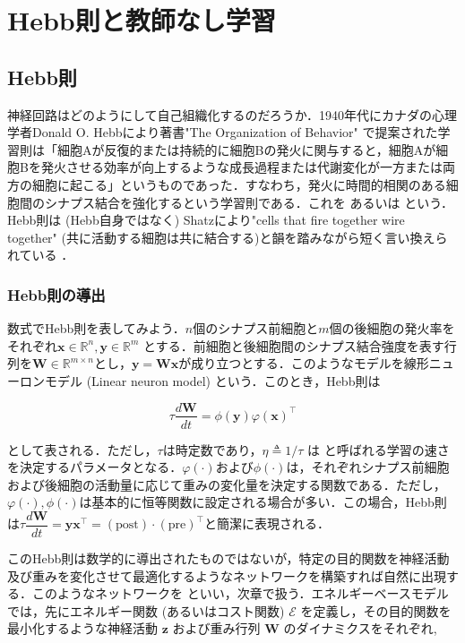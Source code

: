 \section{Hebb則と教師なし学習}
\subsection{Hebb則}
神経回路はどのようにして自己組織化するのだろうか．1940年代にカナダの心理学者Donald O. Hebbにより著書"The Organization of Behavior"\cite{Hebb1949-iv} で提案された学習則は「細胞Aが反復的または持続的に細胞Bの発火に関与すると，細胞Aが細胞Bを発火させる効率が向上するような成長過程または代謝変化が一方または両方の細胞に起こる」というものであった．すなわち，発火に時間的相関のある細胞間のシナプス結合を強化するという学習則である．これを\textbf{} あるいは\textbf{} という．Hebb則は (Hebb自身ではなく) Shatzにより"cells that fire together wire together" (共に活動する細胞は共に結合する)と韻を踏みながら短く言い換えられている \cite{Shatz1992-he}．

\subsubsection{Hebb則の導出}
数式でHebb則を表してみよう．$n$個のシナプス前細胞と$m$個の後細胞の発火率をそれぞれ$\mathbf{x}\in \mathbb{R}^n, \mathbf{y}\in \mathbb{R}^m$ とする．前細胞と後細胞間のシナプス結合強度を表す行列を$\mathbf{W}\in \mathbb{R}^{m\times n}$とし，$\mathbf{y}=\mathbf{W}\mathbf{x}$が成り立つとする．このようなモデルを線形ニューロンモデル (Linear neuron model) という．このとき，Hebb則は


\begin{equation}
\tau\frac{d\mathbf{W}}{dt}=\phi(\mathbf{y})\varphi(\mathbf{x})^\top
\end{equation}


として表される．ただし，$\tau$は時定数であり，$\eta\triangleq1/\tau$ は\textbf{} と呼ばれる学習の速さを決定するパラメータとなる．$\varphi(\cdot)$および$\phi(\cdot)$は，それぞれシナプス前細胞および後細胞の活動量に応じて重みの変化量を決定する関数である．ただし，$\varphi(\cdot), \phi(\cdot)$は基本的に恒等関数に設定される場合が多い．この場合，Hebb則は$
\tau\dfrac{d\mathbf{W}}{dt}=\mathbf{y}\mathbf{x}^\top=(\text{post})\cdot (\text{pre})^\top
$と簡潔に表現される．

このHebb則は数学的に導出されたものではないが，特定の目的関数を神経活動及び重みを変化させて最適化するようなネットワークを構築すれば自然に出現する．このようなネットワークを\textbf{} といい，次章で扱う．エネルギーベースモデルでは，先にエネルギー関数 (あるいはコスト関数) $\mathcal{E}$ を定義し，その目的関数を最小化するような神経活動 $\mathbf{z}$ および重み行列 $\mathbf{W}$ のダイナミクスをそれぞれ,


